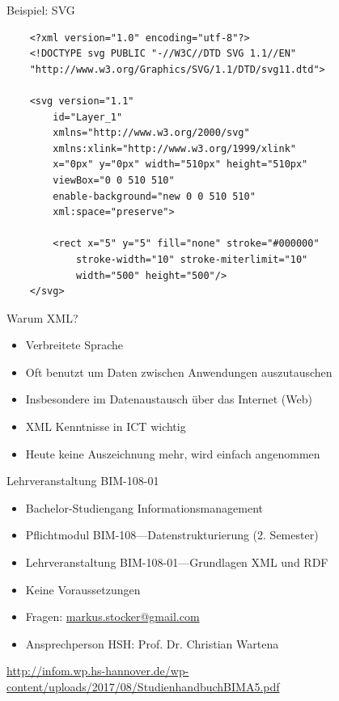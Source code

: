 \documentclass{beamer}
\begin{document}
\begin{frame}[fragile]{Beispiel: SVG}
	\small
	\begin{lstlisting}
	<?xml version="1.0" encoding="utf-8"?>
	<!DOCTYPE svg PUBLIC "-//W3C//DTD SVG 1.1//EN"
	"http://www.w3.org/Graphics/SVG/1.1/DTD/svg11.dtd">

	<svg version="1.1" 
		id="Layer_1" 
		xmlns="http://www.w3.org/2000/svg" 
		xmlns:xlink="http://www.w3.org/1999/xlink" 
		x="0px" y="0px" width="510px" height="510px" 
		viewBox="0 0 510 510" 
		enable-background="new 0 0 510 510" 
		xml:space="preserve">

		<rect x="5" y="5" fill="none" stroke="#000000" 
			stroke-width="10" stroke-miterlimit="10" 
			width="500" height="500"/>
	</svg>
	\end{lstlisting}	
\end{frame}

\begin{frame}{Warum XML?}
	
	\begin{itemize}
		\item Verbreitete Sprache
		\item Oft benutzt um Daten zwischen Anwendungen auszutauschen
		\item Insbesondere im Datenaustausch über das Internet (Web)
		\item XML Kenntnisse in ICT wichtig
		\item Heute keine Auszeichnung mehr, wird einfach angenommen
	\end{itemize}
	
\end{frame}

\begin{frame}{Lehrveranstaltung BIM-108-01}
	
	\begin{itemize}
		\item Bachelor-Studiengang Informationsmanagement
		\item Pflichtmodul BIM-108---Datenstrukturierung (2. Semester)
		\item Lehrveranstaltung BIM-108-01---Grundlagen XML und RDF
		\item Keine Voraussetzungen 
		\item Fragen: \url{markus.stocker@gmail.com}
		\item Ansprechperson HSH: Prof. Dr. Christian Wartena
	\end{itemize}
	
	\vspace{0.5cm}
	
	\url{http://infom.wp.hs-hannover.de/wp-content/uploads/2017/08/StudienhandbuchBIMA5.pdf}
		
\end{frame}
\end{document}
